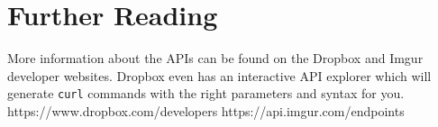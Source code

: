 \documentclass[12pt]{article}
\begin{document}
\section{Further Reading}
More information about the APIs can be found on the Dropbox and Imgur developer websites. Dropbox even has an interactive API explorer which will generate \texttt{curl} commands with the right parameters and syntax for you.
https://www.dropbox.com/developers
https://api.imgur.com/endpoints
\end{document}
